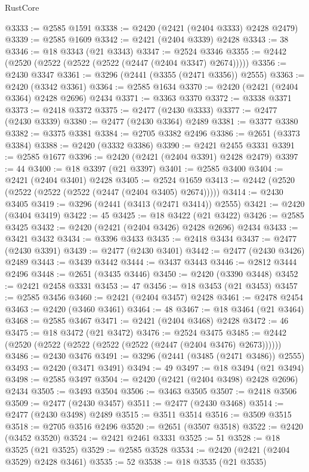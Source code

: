 \begin{lexlean}{RustCore}
\begin{coremodule}
@3333 := @2585 @1591
@3338 := @2420 (@2421 (@2404 @3333) @2428 @2479)
@3339 := @2585 @1609
@3342 := @2421 (@2404 @3339) @2428
@3343 := 38
@3346 := @18 @3343 (@21 @3343)
@3347 := @2524 @3346
@3355 := @2442 (@2520 (@2522 (@2522 (@2522 (@2447 (@2404 @3347) @2674)))))
@3356 := @2430 @3347
@3361 := @3296 (@2441 (@3355 (@2471 @3356)) @2555)
@3363 := @2420 (@3342 @3361)
@3364 := @2585 @1634
@3370 := @2420 (@2421 (@2404 @3364) @2428 @2696) @2434
@3371 := @3363 @3370
@3372 := @3338 @3371
@3373 := @2418 @3372
@3375 := @2477 (@2430 @3333)
@3377 := @2477 (@2430 @3339)
@3380 := @2477 (@2430 @3364) @2489
@3381 := @3377 @3380
@3382 := @3375 @3381
@3384 := @2705 @3382 @2496
@3386 := @2651 (@3373 @3384)
@3388 := @2420 (@3332 @3386)
@3390 := @2421 @2455 @3331
@3391 := @2585 @1677
@3396 := @2420 (@2421 (@2404 @3391) @2428 @2479)
@3397 := 44
@3400 := @18 @3397 (@21 @3397)
@3401 := @2585 @3400
@3404 := @2421 (@2404 @3401) @2428
@3405 := @2524 @1659
@3413 := @2442 (@2520 (@2522 (@2522 (@2522 (@2447 (@2404 @3405) @2674)))))
@3414 := @2430 @3405
@3419 := @3296 (@2441 (@3413 (@2471 @3414)) @2555)
@3421 := @2420 (@3404 @3419)
@3422 := 45
@3425 := @18 @3422 (@21 @3422)
@3426 := @2585 @3425
@3432 := @2420 (@2421 (@2404 @3426) @2428 @2696) @2434
@3433 := @3421 @3432
@3434 := @3396 @3433
@3435 := @2418 @3434
@3437 := @2477 (@2430 @3391)
@3439 := @2477 (@2430 @3401)
@3442 := @2477 (@2430 @3426) @2489
@3443 := @3439 @3442
@3444 := @3437 @3443
@3446 := @2812 @3444 @2496
@3448 := @2651 (@3435 @3446)
@3450 := @2420 (@3390 @3448)
@3452 := @2421 @2458 @3331
@3453 := 47
@3456 := @18 @3453 (@21 @3453)
@3457 := @2585 @3456
@3460 := @2421 (@2404 @3457) @2428
@3461 := @2478 @2454
@3463 := @2420 (@3460 @3461)
@3464 := 48
@3467 := @18 @3464 (@21 @3464)
@3468 := @2585 @3467
@3471 := @2421 (@2404 @3468) @2428
@3472 := 46
@3475 := @18 @3472 (@21 @3472)
@3476 := @2524 @3475
@3485 := @2442 (@2520 (@2522 (@2522 (@2522 (@2522 (@2447 (@2404 @3476) @2673))))))
@3486 := @2430 @3476
@3491 := @3296 (@2441 (@3485 (@2471 @3486)) @2555)
@3493 := @2420 (@3471 @3491)
@3494 := 49
@3497 := @18 @3494 (@21 @3494)
@3498 := @2585 @3497
@3504 := @2420 (@2421 (@2404 @3498) @2428 @2696) @2434
@3505 := @3493 @3504
@3506 := @3463 @3505
@3507 := @2418 @3506
@3509 := @2477 (@2430 @3457)
@3511 := @2477 (@2430 @3468)
@3514 := @2477 (@2430 @3498) @2489
@3515 := @3511 @3514
@3516 := @3509 @3515
@3518 := @2705 @3516 @2496
@3520 := @2651 (@3507 @3518)
@3522 := @2420 (@3452 @3520)
@3524 := @2421 @2461 @3331
@3525 := 51
@3528 := @18 @3525 (@21 @3525)
@3529 := @2585 @3528
@3534 := @2420 (@2421 (@2404 @3529) @2428 @3461)
@3535 := 52
@3538 := @18 @3535 (@21 @3535)

\end{coremodule}
\end{lexlean}
